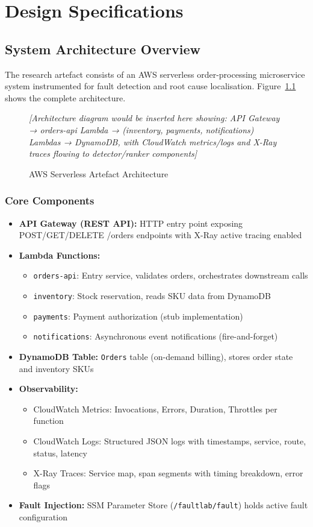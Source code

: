 \chapter{Design Specifications}

\section{System Architecture Overview}

The research artefact consists of an AWS serverless order-processing microservice system instrumented for fault detection and root cause localisation. Figure~\ref{fig:architecture} shows the complete architecture.

\begin{figure}[h]
\centering
\textit{[Architecture diagram would be inserted here showing: API Gateway → orders-api Lambda → (inventory, payments, notifications) Lambdas → DynamoDB, with CloudWatch metrics/logs and X-Ray traces flowing to detector/ranker components]}
\caption{AWS Serverless Artefact Architecture}
\label{fig:architecture}
\end{figure}

\subsection{Core Components}

\begin{itemize}
    \item \textbf{API Gateway (REST API):} HTTP entry point exposing POST/GET/DELETE /orders endpoints with X-Ray active tracing enabled
    \item \textbf{Lambda Functions:}
    \begin{itemize}
        \item \texttt{orders-api}: Entry service, validates orders, orchestrates downstream calls
        \item \texttt{inventory}: Stock reservation, reads SKU data from DynamoDB
        \item \texttt{payments}: Payment authorization (stub implementation)
        \item \texttt{notifications}: Asynchronous event notifications (fire-and-forget)
    \end{itemize}
    \item \textbf{DynamoDB Table:} \texttt{Orders} table (on-demand billing), stores order state and inventory SKUs
    \item \textbf{Observability:}
    \begin{itemize}
        \item CloudWatch Metrics: Invocations, Errors, Duration, Throttles per function
        \item CloudWatch Logs: Structured JSON logs with timestamps, service, route, status, latency
        \item X-Ray Traces: Service map, span segments with timing breakdown, error flags
    \end{itemize}
    \item \textbf{Fault Injection:} SSM Parameter Store (\texttt{/faultlab/fault}) holds active fault configuration
\end{itemize}

